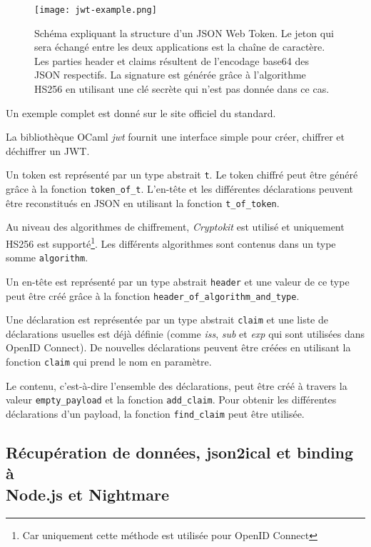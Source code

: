 \begin{figure}
  \centering
  \texttt{[image: jwt-example.png]}
  \caption{Schéma expliquant la structure d'un JSON Web Token. Le jeton qui sera
    échangé entre les deux applications est la chaîne de caractère. Les parties header
    et claims résultent de l'encodage base64 des JSON respectifs. La signature
    est générée grâce à l'algorithme HS256 en utilisant une clé secrète qui
    n'est pas donnée dans ce cas.}
\end{figure}

Un exemple complet est donné sur le site officiel du standard\cite{official-jwt-website}.

La bibliothèque OCaml \emph{jwt}\cite{ocaml-jwt-github} fournit une interface
simple pour créer, chiffrer et déchiffrer un JWT.

Un token est représenté par un type abstrait \verb|t|. Le token chiffré peut
être généré grâce à la fonction \verb|token_of_t|. L'en-tête et les différentes
déclarations peuvent être reconstitués en JSON en utilisant la fonction
\verb|t_of_token|.

Au niveau des algorithmes de chiffrement,
\textit{Cryptokit}\cite{ocaml-cryptokit-ocaml-forge} est utilisé et uniquement
HS256 est supporté\footnote{Car uniquement cette méthode est utilisée pour OpenID
  Connect}. Les différents algorithmes sont contenus dans un type somme \verb|algorithm|.

Un en-tête  est représenté par un type abstrait \verb|header| et une valeur de ce
type peut être créé grâce à la fonction \verb|header_of_algorithm_and_type|.

Une déclaration est représentée par un type abstrait \verb|claim| et une liste de
déclarations usuelles est déjà définie (comme \emph{iss}, \emph{sub} et \emph{exp} qui
sont utilisées dans OpenID Connect). De nouvelles déclarations peuvent être
créées en utilisant la fonction \verb|claim| qui prend le nom en paramètre.

Le contenu, c'est-à-dire l'ensemble des déclarations, peut être créé à travers la
valeur \verb|empty_payload| et la fonction \verb|add_claim|.
Pour obtenir les différentes déclarations d'un payload, la fonction \verb|find_claim|
peut être utilisée.

\subsection{Récupération de données, json2ical et binding à \\ Node.js  et Nightmare}

